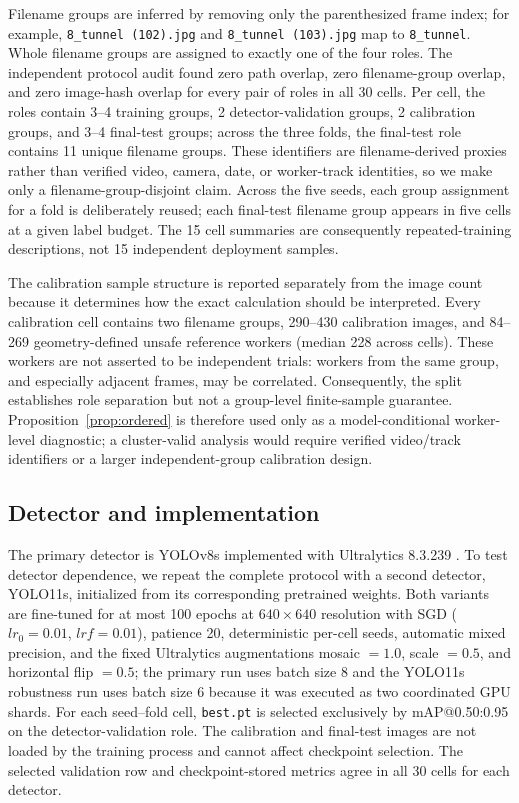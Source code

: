 \documentclass[iicol,pdflatex,sn-mathphys-num]{sn-jnl}
\begin{document}
Filename groups are inferred by removing only the parenthesized frame index; for example, \texttt{8\_tunnel (102).jpg} and \texttt{8\_tunnel (103).jpg} map to \texttt{8\_tunnel}. Whole filename groups are assigned to exactly one of the four roles. The independent protocol audit found zero path overlap, zero filename-group overlap, and zero image-hash overlap for every pair of roles in all 30 cells. Per cell, the roles contain 3--4 training groups, 2 detector-validation groups, 2 calibration groups, and 3--4 final-test groups; across the three folds, the final-test role contains 11 unique filename groups. These identifiers are filename-derived proxies rather than verified video, camera, date, or worker-track identities, so we make only a filename-group-disjoint claim. Across the five seeds, each group assignment for a fold is deliberately reused; each final-test filename group appears in five cells at a given label budget. The 15 cell summaries are consequently repeated-training descriptions, not 15 independent deployment samples.

The calibration sample structure is reported separately from the image count because it determines how the exact calculation should be interpreted. Every calibration cell contains two filename groups, 290--430 calibration images, and 84--269 geometry-defined unsafe reference workers (median 228 across cells). These workers are not asserted to be independent trials: workers from the same group, and especially adjacent frames, may be correlated. Consequently, the split establishes role separation but not a group-level finite-sample guarantee. Proposition~\ref{prop:ordered} is therefore used only as a model-conditional worker-level diagnostic; a cluster-valid analysis would require verified video/track identifiers or a larger independent-group calibration design.

\subsection{Detector and implementation}

The primary detector is YOLOv8s implemented with Ultralytics 8.3.239 \cite{ultralytics2025}. To test detector dependence, we repeat the complete protocol with a second detector, YOLO11s, initialized from its corresponding pretrained weights. Both variants are fine-tuned for at most 100 epochs at $640\times640$ resolution with SGD ($lr_0=0.01$, $lrf=0.01$), patience 20, deterministic per-cell seeds, automatic mixed precision, and the fixed Ultralytics augmentations mosaic $=1.0$, scale $=0.5$, and horizontal flip $=0.5$; the primary run uses batch size 8 and the YOLO11s robustness run uses batch size 6 because it was executed as two coordinated GPU shards. For each seed--fold cell, \texttt{best.pt} is selected exclusively by mAP@0.50:0.95 on the detector-validation role. The calibration and final-test images are not loaded by the training process and cannot affect checkpoint selection. The selected validation row and checkpoint-stored metrics agree in all 30 cells for each detector.
\end{document}
